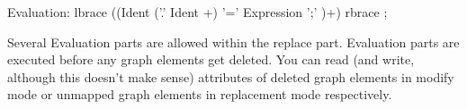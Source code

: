\begin{rail}    
   Evaluation: lbrace ((Ident ('.' Ident +) '=' Expression ';' )+) rbrace ;
\end{rail}
Several Evaluation parts are allowed within the replace part. Evaluation parts are executed before any graph elements get deleted. You can read (and write, although this doesn't make sense) attributes of deleted graph elements in modify mode or unmapped graph elements in replacement mode respectively.
